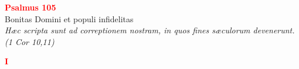 


\def\greinitialformat#1{%
{\fontsize{39}{39}\selectfont #1}%
}




\vspace{0.3cm}
\begin{center}
 \textcolor{red}{\large \bf Psalmus 105}\\
Bonitas Domini et populi infidelitas\\
\textit{\small Hæc scripta sunt ad correptionem nostram, in quos fines sæculorum devenerunt. (1 Cor 10,11)}
\end{center}
\begin{center}
\textcolor{red}{\bf I}
\end{center}

